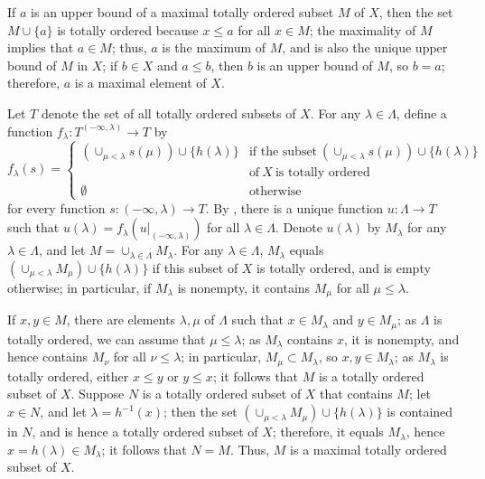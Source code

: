 \documentclass{article}
\begin{document}
\begin{solution}[\ref{exe:9d868h6m}]
  \label{sol:yfgula0x}
  If \(a\) is an upper bound of a maximal totally ordered subset \(M\)
  of \(X\), then the set \(M \cup \{ a \}\) is totally ordered because
  \(x \leq a\) for all \(x \in M\); the maximality of \(M\) implies
  that \(a \in M\); thus, \(a\) is the maximum of \(M\), and is also
  the unique upper bound of \(M\) in \(X\); if \(b \in X\) and
  \(a \leq b\), then \(b\) is an upper bound of \(M\), so \(b = a\);
  therefore, \(a\) is a maximal element of \(X\).

  Let \(T\) denote the set of all totally ordered subsets of \(X\).
  For any \(\lambda \in \Lambda\), define a function
  \(f_\lambda : T^{(-\infty, \lambda)} \to T\) by
  \begin{displaymath}
    f_\lambda(s) =
    \begin{cases}
      (\cup_{\mu < \lambda} s(\mu)) \cup \{ h(\lambda) \}
      & \text{if the subset} ~
        (\cup_{\mu < \lambda} s(\mu)) \cup \{ h(\lambda) \} \\
      & \text{of} ~ X ~ \text{is totally ordered} \\
      \emptyset
      & \text{otherwise}
    \end{cases}
  \end{displaymath}
  for every function \(s : (-\infty, \lambda) \to T\).  By
  , there is a unique function
  \(u : \Lambda \to T\) such that
  \(u(\lambda) = f_\lambda(u \vert_{(-\infty, \lambda)})\) for all
  \(\lambda \in \Lambda\).  Denote \(u(\lambda)\) by \(M_\lambda\) for
  any \(\lambda \in \Lambda\), and let
  \(M = \cup_{\lambda \in \Lambda} M_\lambda\).  For any
  \(\lambda \in \Lambda\), \(M_\lambda\) equals
  \((\cup_{\mu < \lambda} M_\mu) \cup \{ h(\lambda) \}\) if this
  subset of \(X\) is totally ordered, and is empty otherwise; in
  particular, if \(M_\lambda\) is nonempty, it contains \(M_\mu\) for
  all \(\mu \leq \lambda\).

  If \(x, y \in M\), there are elements \(\lambda, \mu\) of
  \(\Lambda\) such that \(x \in M_\lambda\) and \(y \in M_\mu\); as
  \(\Lambda\) is totally ordered, we can assume that
  \(\mu \leq \lambda\); as \(M_\lambda\) contains \(x\), it is
  nonempty, and hence contains \(M_\nu\) for all
  \(\nu \leq \lambda\); in particular, \(M_\mu \subset M_\lambda\), so
  \(x, y \in M_\lambda\); as \(M_\lambda\) is totally ordered, either
  \(x \leq y\) or \(y \leq x\); it follows that \(M\) is a totally
  ordered subset of \(X\).  Suppose \(N\) is a totally ordered subset
  of \(X\) that contains \(M\); let \(x \in N\), and let
  \(\lambda = h^{-1}(x)\); then the set
  \((\cup_{\mu < \lambda} M_\mu) \cup \{ h(\lambda) \}\) is contained
  in \(N\), and is hence a totally ordered subset of \(X\); therefore,
  it equals \(M_\lambda\), hence \(x = h(\lambda) \in M_\lambda\); it
  follows that \(N = M\).  Thus, \(M\) is a maximal totally ordered
  subset of \(X\).
\end{solution}
\end{document}
